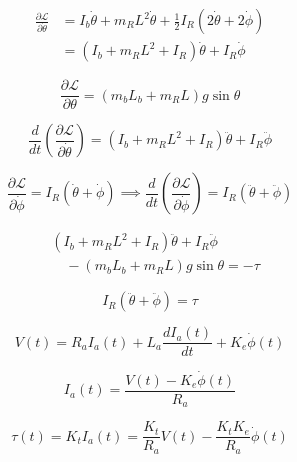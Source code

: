 \documentclass[conference]{IEEEtran}
\begin{document}
\begin{equation}
\begin{aligned}
\frac{\partial \mathcal{L}}{\partial \dot{\theta}} &= I_b \dot{\theta} + m_R L^2 \dot{\theta} + \frac{1}{2} I_R (2\dot{\theta} + 2\dot{\phi}) \\
&= (I_b + m_R L^2 + I_R) \dot{\theta} + I_R \dot{\phi}
\end{aligned}
\end{equation}

\begin{equation}
\frac{\partial \mathcal{L}}{\partial \theta} = (m_b L_b + m_R L) g \sin\theta
\end{equation}

\begin{equation}
\frac{d}{dt}\left(\frac{\partial \mathcal{L}}{\partial \dot{\theta}}\right) = (I_b + m_R L^2 + I_R) \ddot{\theta} + I_R \ddot{\phi}
\end{equation}

\begin{equation}
\frac{\partial \mathcal{L}}{\partial \dot{\phi}} = I_R (\dot{\theta} + \dot{\phi}) \implies \frac{d}{dt}\left(\frac{\partial \mathcal{L}}{\partial \dot{\phi}}\right) = I_R (\ddot{\theta} + \ddot{\phi})
\end{equation}

\begin{equation}
\begin{aligned}
&(I_b + m_R L^2 + I_R) \ddot{\theta} + I_R \ddot{\phi} \\
&\quad - (m_b L_b + m_R L) g \sin\theta = -\tau
\end{aligned}
\end{equation}


\begin{equation}
I_R (\ddot{\theta} + \ddot{\phi}) = \tau
\end{equation}

\begin{equation}
V(t) = R_a I_a(t) + L_a \frac{dI_a(t)}{dt} + K_e \dot{\phi}(t)
\end{equation}

\begin{equation}
I_a(t) = \frac{V(t) - K_e \dot{\phi}(t)}{R_a}
\end{equation}

\begin{equation}
\tau(t) = K_t I_a(t) = \frac{K_t}{R_a} V(t) - \frac{K_t K_e}{R_a} \dot{\phi}(t)
\end{equation}
\end{document}
